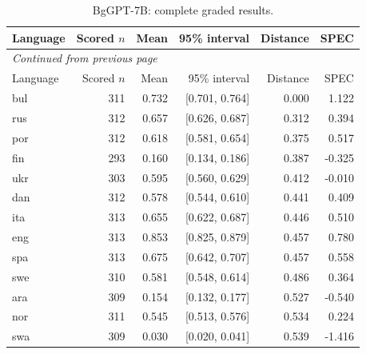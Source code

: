 \endgroup

\begingroup\footnotesize\setlength{\tabcolsep}{3pt}\renewcommand{\arraystretch}{1.12}

\begin{longtable}{lrrrrr}

\caption{BgGPT-7B: complete graded results.}\label{tab:detail-bggpt_7b}\\

\toprule

Language & Scored $n$ & Mean & 95\% interval & Distance & SPEC\\\midrule

\endfirsthead

\multicolumn{6}{l}{\textit{Continued from previous page}}\\

\toprule

Language & Scored $n$ & Mean & 95\% interval & Distance & SPEC\\\midrule

\endhead

\bottomrule\endfoot

bul & 311 & 0.732 & [0.701, 0.764] & 0.000 & 1.122\\

rus & 312 & 0.657 & [0.626, 0.687] & 0.312 & 0.394\\

por & 312 & 0.618 & [0.581, 0.654] & 0.375 & 0.517\\

fin & 293 & 0.160 & [0.134, 0.186] & 0.387 & -0.325\\

ukr & 303 & 0.595 & [0.560, 0.629] & 0.412 & -0.010\\

dan & 312 & 0.578 & [0.544, 0.610] & 0.441 & 0.409\\

ita & 313 & 0.655 & [0.622, 0.687] & 0.446 & 0.510\\

eng & 313 & 0.853 & [0.825, 0.879] & 0.457 & 0.780\\

spa & 313 & 0.675 & [0.642, 0.707] & 0.457 & 0.558\\

swe & 310 & 0.581 & [0.548, 0.614] & 0.486 & 0.364\\

ara & 309 & 0.154 & [0.132, 0.177] & 0.527 & -0.540\\

nor & 311 & 0.545 & [0.513, 0.576] & 0.534 & 0.224\\

swa & 309 & 0.030 & [0.020, 0.041] & 0.539 & -1.416\\

\end{longtable}

